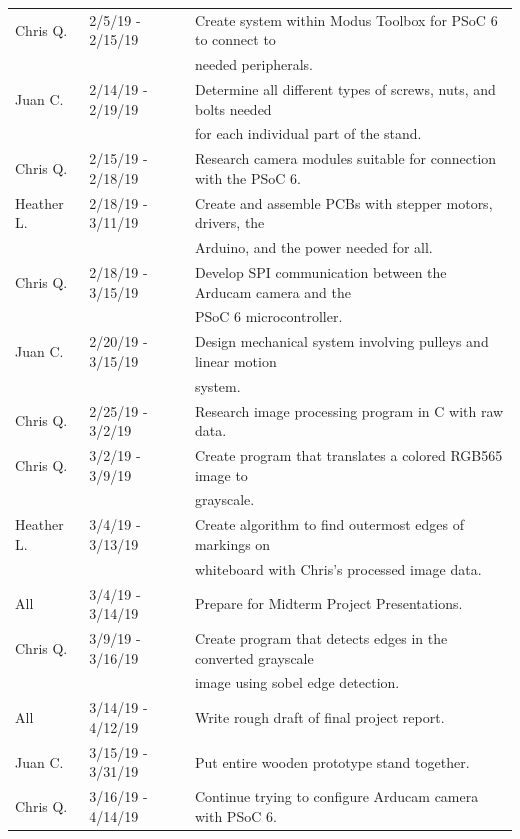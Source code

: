 \begin{table} [H]
\begin{tabular}{|l|l|l|}
		\hline
		Chris Q. & 2/5/19 - 2/15/19 	& Create system within Modus Toolbox for PSoC 6 to connect to \\
				&						& needed peripherals. \\
		\hline
		Juan C. & 2/14/19 - 2/19/19 	& Determine all different types of screws, nuts, and bolts needed \\
				&						& for each individual part of the stand. \\
		\hline
		Chris Q. & 2/15/19 - 2/18/19 	& Research camera modules suitable for connection with the PSoC 6. \\
		\hline
		Heather L. & 2/18/19 - 3/11/19 	& Create and assemble PCBs with stepper motors, drivers, the \\ 
				&						& Arduino, and the power needed for all. \\
		\hline
		Chris Q. & 2/18/19 - 3/15/19 	& Develop SPI communication between the Arducam camera and the \\ 		&						& PSoC 6 microcontroller. \\
		\hline
		Juan C. & 2/20/19 - 3/15/19 	& Design mechanical system involving pulleys and linear motion \\
				&						& system. \\
		\hline
		Chris Q. & 2/25/19 - 3/2/19 	& Research image processing program in C with raw data. \\
		\hline
		Chris Q. & 3/2/19 - 3/9/19 		& Create program that translates a colored RGB565 image to \\
				&						& grayscale. \\
				\hline
		Heather L. & 3/4/19 - 3/13/19 	& Create algorithm to find outermost edges of markings on \\
				&						& whiteboard with Chris's processed image data. \\
		\hline
		All & 3/4/19 - 3/14/19 			& Prepare for Midterm Project Presentations. \\
		\hline
		Chris Q. & 3/9/19 - 3/16/19 	& Create program that detects edges in the converted grayscale \\ 		&						& image using sobel edge detection. \\
		\hline
		All & 3/14/19 - 4/12/19 		& Write rough draft of final project report. \\
		\hline
		Juan C. & 3/15/19 - 3/31/19 	& Put entire wooden prototype stand together. \\
		\hline
		Chris Q. & 3/16/19 - 4/14/19 	& Continue trying to configure Arducam camera with PSoC 6. \\

\end{tabular}
\end{table}
